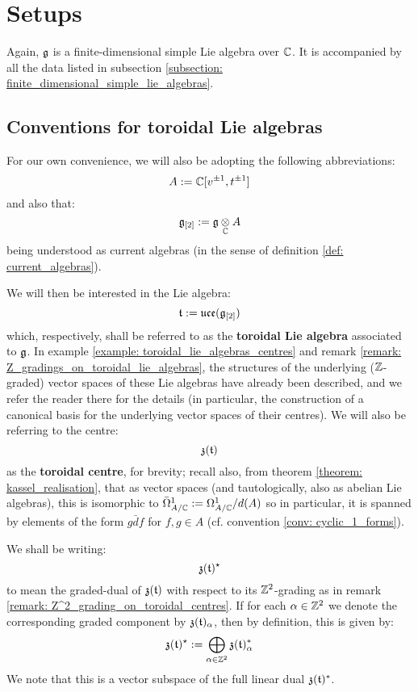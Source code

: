 \section{Setups}
    Again, $\mathfrak{g}$ is a finite-dimensional simple Lie algebra over $\mathbb{C}$. It is accompanied by all the data listed in subsection \ref{subsection: finite_dimensional_simple_lie_algebras}. 

    \subsection{Conventions for toroidal Lie algebras} \label{subsection: toroidal_lie_algebra_conventions}
        For our own convenience, we will also be adopting the following abbreviations:
            $$A := \mathbb{C}[v^{\pm 1}, t^{\pm 1}]$$
        and also that:
            $$\g_{[2]} := \g \tensor_{\bbC} A$$
        being understood as current algebras (in the sense of definition \ref{def: current_algebras}).
    
        We will then be interested in the Lie algebra:
            $$\mathfrak{t} := \mathfrak{uce}(\mathfrak{g}_{[2]})$$
        which, respectively, shall be referred to as the \textbf{toroidal Lie algebra} associated to $\mathfrak{g}$. In example \ref{example: toroidal_lie_algebras_centres} and remark \ref{remark: Z_gradings_on_toroidal_lie_algebras}, the structures of the underlying ($\mathbb{Z}$-graded) vector spaces of these Lie algebras have already been described, and we refer the reader there for the details (in particular, the construction of a canonical basis for the underlying vector spaces of their centres). We will also be referring to the centre:
            $$\mathfrak{z}(\mathfrak{t})$$
        as the \textbf{toroidal centre}, for brevity; recall also, from theorem \ref{theorem: kassel_realisation}, that as vector spaces (and tautologically, also as abelian Lie algebras), this is isomorphic to $\bar{\Omega}^1_{A/\mathbb{C}} := \Omega^1_{A/\mathbb{C}}/d(A)$ so in particular, it is spanned by elements of the form $g \bar{d}f$ for $f, g \in A$ (cf. convention \ref{conv: cyclic_1_forms}).

        We shall be writing:
            $$\mathfrak{z}(\mathfrak{t})^{\star}$$
        to mean the graded-dual of $\mathfrak{z}(\mathfrak{t})$ with respect to its $\mathbb{Z}^2$-grading as in remark \ref{remark: Z^2_grading_on_toroidal_centres}. If for each $\alpha \in \mathbb{Z}^2$ we denote the corresponding graded component by $\mathfrak{z}(\mathfrak{t})_{\alpha}$, then by definition, this is given by:
            $$\mathfrak{z}(\mathfrak{t})^{\star} := \bigoplus_{\alpha \in \mathbb{Z}^2} \mathfrak{z}(\mathfrak{t})_{\alpha}^*$$
        We note that this is a vector subspace of the full linear dual $\mathfrak{z}(\mathfrak{t})^*$.
    
